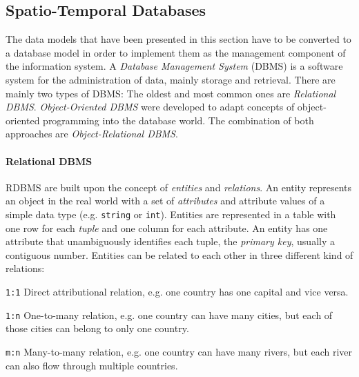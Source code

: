 

\subsection{Spatio-Temporal Databases} %
\label{sub:spatio_temporal_databases}

The data models that have been presented in this section have to be converted to a database model in order to implement them as the management component of the information system. A \emph{Database Management System} (DBMS) is a software system for the administration of data, mainly storage and retrieval. There are mainly two types of DBMS: The oldest and most common ones are \emph{Relational DBMS}. \emph{Object-Oriented DBMS} were developed to adapt concepts of object-oriented programming into the database world. The combination of both approaches are \emph{Object-Relational DBMS}.

\paragraph{Relational DBMS} %
\label{par:relational_dbms}

RDBMS are built upon the concept of \emph{entities} and \emph{relations}. An entity represents an object in the real world with a set of \emph{attributes} and attribute values of a simple data type (e.g. \texttt{string} or \texttt{int}). Entities are represented in a table with one row for each \emph{tuple} and one column for each attribute. An entity has one attribute that unambiguously identifies each tuple, the \emph{primary key}, usually a contiguous number. Entities can be related to each other in three different kind of relations:
\begin{compactenum}
  \item[\texttt{1:1}] Direct attributional relation, e.g. one country has one capital and vice versa.
  \item[\texttt{1:n}] One-to-many relation, e.g. one country can have many cities, but each of those cities can belong to only one country.
  \item[\texttt{m:n}] Many-to-many relation, e.g. one country can have many rivers, but each river can also flow through multiple countries.
\end{compactenum}

